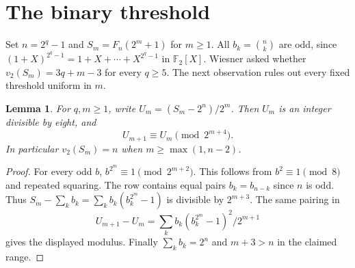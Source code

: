 \documentclass[11pt]{article}
\newtheorem{lemma}[theorem]{Lemma}
\begin{document}
\section{The binary threshold}
Set $n=2^q-1$ and $S_m=F_n(2^m+1)$ for $m\ge1$. All $b_k=\binom nk$ are odd, since $(1+X)^{2^q-1}=1+X+\cdots+X^{2^q-1}$ in $\mathbb F_2[X]$. Wiesner asked whether $v_2(S_m)=3q+m-3$ for every $q\ge5$. The next observation rules out every fixed threshold uniform in $m$.
\begin{lemma}\label{lift}
For $q,m\ge1$, write $U_m=(S_m-2^n)/2^m$. Then $U_m$ is an integer divisible by eight, and
\[
 U_{m+1}\equiv U_m\pmod{2^{m+4}}.
\]
In particular $v_2(S_m)=n$ when $m\ge\max(1,n-2)$.
\end{lemma}
\begin{proof}
For every odd $b$, $b^{2^m}\equiv1\pmod{2^{m+2}}$. This follows from $b^2\equiv1\pmod8$ and repeated squaring. The row contains equal pairs $b_k=b_{n-k}$ since $n$ is odd. Thus $S_m-\sum_k b_k=\sum_k b_k(b_k^{2^m}-1)$ is divisible by $2^{m+3}$. The same pairing in
\[
 U_{m+1}-U_m=\sum_k b_k(b_k^{2^m}-1)^2/2^{m+1}
\]
gives the displayed modulus. Finally $\sum_k b_k=2^n$ and $m+3>n$ in the claimed range.
\end{proof}
\end{document}
